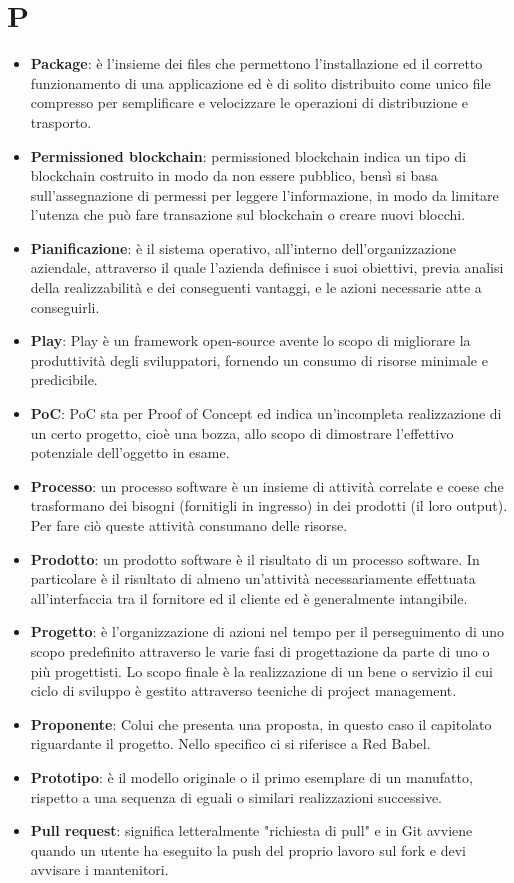 \documentclass[a4paper, oneside, openany]{article}
\begin{document}
\section{P}
\begin{itemize}
\item \textbf{Package}: è l'insieme dei files che permettono l'installazione ed il corretto funzionamento di una applicazione ed è di solito distribuito come unico file compresso per semplificare e velocizzare le operazioni di distribuzione e trasporto.
\item \textbf{Permissioned blockchain}: permissioned blockchain indica un tipo di blockchain costruito in modo da non essere pubblico, bensì si basa sull'assegnazione di permessi per leggere l'informazione, in modo da limitare l'utenza che può fare transazione sul blockchain o creare nuovi blocchi.
\item \textbf{Pianificazione}: è il sistema operativo, all'interno dell'organizzazione aziendale, attraverso il quale l'azienda definisce i suoi obiettivi, previa analisi della realizzabilità e dei conseguenti vantaggi, e le azioni necessarie atte a conseguirli.
\item \textbf{Play}: Play è un framework open-source avente lo scopo di migliorare la produttività degli sviluppatori, fornendo un consumo di risorse minimale e predicibile.
\item \textbf{PoC}: PoC sta per Proof of Concept ed indica un'incompleta realizzazione di un certo progetto, cioè una bozza, allo scopo di dimostrare l'effettivo potenziale dell'oggetto in esame.
\item \textbf{Processo}: un processo software è un insieme di attività correlate e coese che trasformano dei bisogni (fornitigli in ingresso) in dei prodotti (il loro output).
Per fare ciò queste attività consumano delle risorse.%
\item \textbf{Prodotto}: un prodotto software è il risultato di un processo software. In particolare è il risultato di almeno un'attività necessariamente effettuata all’interfaccia tra il fornitore ed il cliente ed è generalmente intangibile.
\item \textbf{Progetto}: è l'organizzazione di azioni nel tempo per il perseguimento di uno scopo predefinito attraverso le varie fasi di progettazione da parte di uno o più progettisti. Lo scopo finale è la realizzazione di un bene o servizio il cui ciclo di sviluppo è gestito attraverso tecniche di project management.
\item \textbf{Proponente}: Colui che presenta una proposta, in questo caso il capitolato riguardante il progetto. Nello specifico ci si riferisce a Red Babel.
\item \textbf{Prototipo}: è il modello originale o il primo esemplare di un manufatto, rispetto a una sequenza di eguali o similari realizzazioni successive.
\item \textbf{Pull request}: significa letteralmente "richiesta di pull" e in Git avviene quando un utente ha eseguito la push del proprio lavoro sul fork e devi avvisare i mantenitori.
\end{itemize}
\end{document}

